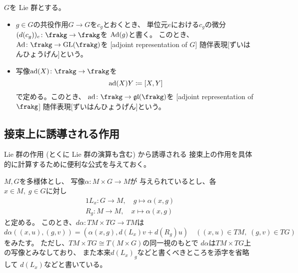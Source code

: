 \documentclass[report]{jlreq}
\begin{document}
\begin{definition}[随伴表現]
    $G$を Lie 群とする。
    \begin{itemize}
        \item $g \in G$の共役作用$G \to G$を$c_g$とおくとき、
            単位元$e$における$c_g$の微分$(d(c_g))_e \colon \frakg \to \frakg$を
            $\operatorname{Ad}(g)$と書く。
            このとき、$\Ad \colon \frakg \to \GL(\frakg)$を
            [adjoint representation of $G$]
            {随伴表現}[ずいはんひょうげん]という。
        \item 写像$\ad(X) \colon \frakg \to \frakg$を
            \begin{equation}
                \operatorname{ad}(X)Y \coloneqq [X, Y]
            \end{equation}
            で定める。このとき、
            $\ad \colon \frakg \to \mathfrak{gl}(\frakg)$を
            [adjoint representation of $\frakg$]
            {随伴表現}[ずいはんひょうげん]という。
    \end{itemize}
\end{definition}


\subsection{接束上に誘導される作用}

Lie 群の作用 (とくに Lie 群の演算も含む) から誘導される
接束上の作用を具体的に計算するために便利な公式を与えておく。

\begin{lemma}
    $M, G$を多様体とし、
    {\smooth}写像$\alpha \colon M \times G \to M$が
    与えられているとし、各$x \in M, \; g \in G$に対し
    \begin{alignat}{1}
        L_x \colon G \to M, \quad g \mapsto \alpha(x, g) \\
        R_g \colon M \to M, \quad x \mapsto \alpha(x, g)
    \end{alignat}
    と定める。
    このとき、$d\alpha \colon TM \times TG \to TM$は
    \begin{equation}
        d\alpha((x, u), (g, v))
            = (\alpha(x, g), d(L_x) v + d(R_g) u)
            \quad
            ((x, u) \in TM, \; (g, v) \in TG)
    \end{equation}
    をみたす。
    ただし、$TM \times TG \cong T(M \times G)$の同一視のもとで
    $d\alpha$は$TM \times TG$上の写像とみなしており、
    また本来$d(L_x)_g$などと書くべきところを添字を省略して
    $d(L_x)$などと書いている。
\end{lemma}
\end{document}
